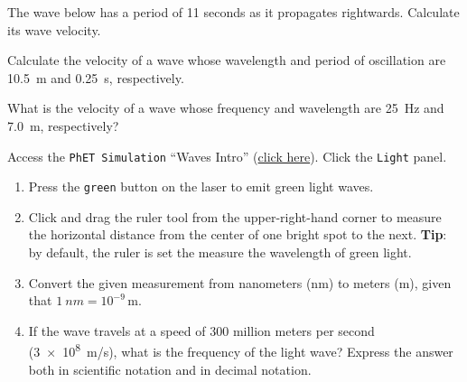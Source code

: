 \documentclass[]{exam}
\begin{document}
\begin{questions}
\question \label{HcdmDZ}
The wave below has a period of 11 seconds as it propagates rightwards. Calculate its wave velocity.

\begin{center}
\end{center}


\question \label{exdA2j}
Calculate the velocity of a wave whose wavelength and period of oscillation are \SI{10.5}{m} and \SI{0.25}{s}, respectively. 


\question \label{HoRqxe}
What is the velocity of a wave whose frequency and wavelength are \SI{25}{Hz} and \SI{7.0}{m}, respectively?


\question
Access the \texttt{PhET Simulation} ``Waves Intro'' (\href{https://phet.colorado.edu/sims/html/waves-intro/latest/waves-intro_en.html}{click here}). Click the \texttt{Light} panel. 

\begin{enumerate}
\setlength\itemsep{0.1ex}
    \item Press the \texttt{green} button on the laser to emit green light waves.
    \item Click and drag the ruler tool from the upper-right-hand corner to measure the horizontal distance from the center of one bright spot to the next. \textbf{Tip}: by default, the ruler is set the measure the wavelength of green light.
    \item Convert the given measurement from nanometers (nm) to meters (m), given that $\SI{1}{nm} = 10^{-9}\,\text{m}$.
    \item If the wave travels at a speed of 300 million meters per second (\SI{3e8}{m/s}), what is the frequency of the light wave? Express the answer both in scientific notation and in decimal notation.
\end{enumerate}
\end{questions}
\end{document}
